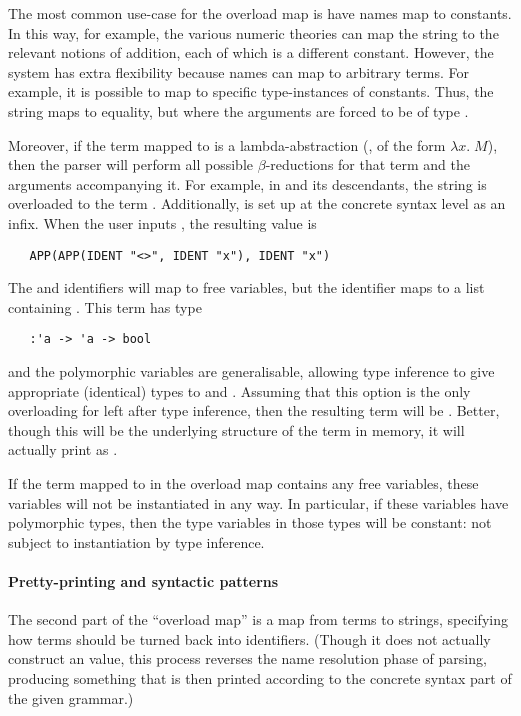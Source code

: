 The most common use-case for the overload map is have names map to
constants.  In this way, for example, the various numeric theories can
map the string  to the relevant notions of addition, each of
which is a different constant.  However, the system has extra
flexibility because names can map to arbitrary terms.  For example, it
is possible to map to specific type-instances of constants.  Thus, the
string  maps to equality, but where the arguments are forced
to be of type .

Moreover, if the term mapped to is a lambda-abstraction (\ie, of the
form $\lambda x.\;M$), then the parser will perform all possible
$\beta$-reductions for that term and the arguments accompanying it.  For
example, in  and its descendants, the string
 is overloaded to the term .
Additionally,  is set up at the concrete syntax level as an
infix.  When the user inputs , the resulting
 value is
\begin{verbatim}
   APP(APP(IDENT "<>", IDENT "x"), IDENT "x")
\end{verbatim}
The   and  identifiers will map to free variables, but
the  identifier maps to a list containing
. This term has type
\begin{verbatim}
   :'a -> 'a -> bool
\end{verbatim}
and the polymorphic variables are generalisable, allowing type
inference to give appropriate (identical) types to  and .
Assuming that this option is the only overloading for  left
after type inference, then the resulting term will be
.  Better, though this will be the underlying
structure of the term in memory, it will actually print as
.

If the term mapped to in the overload map contains any free variables,
these variables will not be instantiated in any way.  In particular,
if these variables have polymorphic types, then the type variables in
those types will be constant: not subject to instantiation by type
inference.

\paragraph{Pretty-printing and syntactic patterns} The second part of
the ``overload map'' is a map from terms to strings, specifying how
terms should be turned back into identifiers.  (Though it does not
actually construct an  value, this process reverses the name
resolution phase of parsing, producing something that is then printed
according to the concrete syntax part of the given grammar.)

